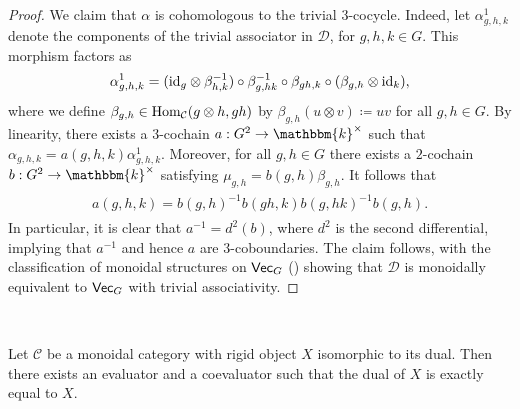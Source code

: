 \begin{proof}
\noindent We claim that $\alpha$ is cohomologous to the trivial $3$-cocycle. Indeed, let $\alpha^1_{g,h,k}$ denote the components of the trivial associator in $\mathcal{D}$, for $g, h, k \in G$. This morphism factors as
\begin{align*}
\begin{split}
\alpha^1_{g,h,k} = (\textup{id}_g \otimes \beta_{h,k}^{-1}) \circ \beta_{g,hk}^{-1} \circ \beta_{gh,k} \circ (\beta_{g,h} \otimes \textup{id}_k),
\end{split}
\end{align*}
\noindent where we define $\beta_{g,h} \in \textup{Hom}_\mathcal{C}(g\otimes h, gh)$ by $\beta_{g,h}(u \otimes v) \coloneqq uv$ for all $g, h \in G$. By linearity, there exists a $3$-cochain $a : G^2 \to \mathbbm{k}^\times$ such that $\alpha_{g,h,k} = a(g,h,k)\alpha^1_{g,h,k}$. Moreover, for all $g, h \in G$ there exists a $2$-cochain $b : G^2 \to \mathbbm{k}^\times$ satisfying $\mu_{g,h} = b(g, h)\beta_{g,h}$. It follows that
\begin{align*}
\begin{split}
a(g,h,k) = b(g,h)^{-1}b(gh,k)b(g,hk)^{-1}b(g,h).
\end{split}
\end{align*}
\noindent In particular, it is clear that $a^{-1} = d^2(b)$, where $d^2$ is the second differential, implying that $a^{-1}$ and hence $a$ are $3$-coboundaries. The claim follows, with the classification of monoidal structures on $\textup{\textsf{Vec}}_G$ (\cite[Proposition 2.6.1]{EGNO16}) showing that $\mathcal{D}$ is monoidally equivalent to $\textup{\textsf{Vec}}_G$ with trivial associativity. %
\end{proof}\\

\noindent\begin{lemma}\label{SelfDual} Let $\mathcal{C}$ be a monoidal category with rigid object $X$ isomorphic to its dual. Then there exists an evaluator and a coevaluator such that the dual of $X$ is exactly equal to $X$.\\
\end{lemma}

